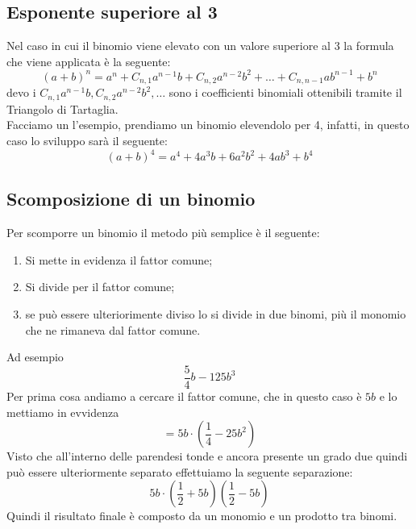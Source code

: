 \documentclass{article}
\begin{document}
\subsection{Esponente superiore al 3}
Nel caso in cui il binomio viene elevato con un valore superiore al 3 la formula che viene applicata è la
seguente:
\begin{equation}
  \label{eq:binomioformelev}
  (a+b)^n=a^n+C_{n,1}a^{n-1}b+C_{n,2}a^{n-2}b^2+\dots+C_{n,n-1}ab^{n-1}+b^n
\end{equation}
devo i $C_{n,1}a^{n-1}b,C_{n,2}a^{n-2}b^2,\dots$ sono i coefficienti binomiali ottenibili tramite il Triangolo di
Tartaglia.\\
Facciamo un l'esempio, prendiamo un binomio elevendolo per 4, infatti, in questo caso lo sviluppo sarà il
seguente:
\begin{equation}
  \label{eq:polquartogrado}
  (a+b)^4=a^4 + 4a^3b+6a^2b^2+4ab^3+b^4
\end{equation}

\subsection{Scomposizione di un binomio}
\label{sec:scomposizionebin}
Per scomporre un binomio il metodo più semplice è il seguente:
\begin{enumerate}
\item Si mette in evidenza il fattor comune;
\item Si divide per il fattor comune;
\item se può essere ulteriorimente diviso lo si divide in due binomi, più il monomio che ne rimaneva dal fattor
  comune.
\end{enumerate}
Ad esempio
\begin{equation}
  \label{eq:scomposizionebin}
  \frac{5}{4}b-125b^3
\end{equation}
Per prima cosa andiamo a cercare il fattor comune, che in questo caso è $5b$ e lo mettiamo in evvidenza
\begin{equation*}
  =5b\cdot\left(\frac{1}{4}-25b^2\right)
\end{equation*}
Visto che all'interno delle parendesi tonde e ancora presente un grado due quindi può essere ulteriormente
separato effettuiamo la seguente separazione:
\begin{equation*}
  5b\cdot \left(\frac{1}{2} + 5b\right)\left(\frac{1}{2}-5b\right)
\end{equation*}
Quindi il risultato finale è composto da un monomio e un prodotto tra binomi.
\clearpage
\end{document}
